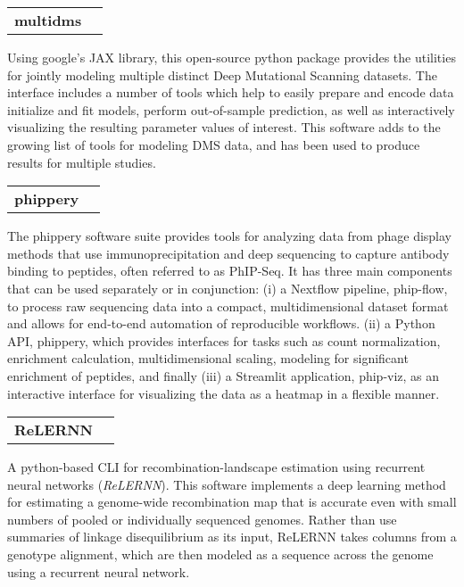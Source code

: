 \documentclass[letterpaper,9pt]{article}
\makeatletter
\let\oldhref\href
\newcommand{\resumeSoftwareSubheading}[3]{
  \vspace{-3pt}\item
    \begin{tabular*}{0.97\textwidth}[t]{l@{\extracolsep{\fill}}r}
      \textbf{#1}\label{#1} & #2 \\
    \end{tabular*}\vspace{-7pt}
    \begin{center}
    \begin{minipage}{0.87\textwidth}
    \linespread{0.80}\selectfont
        {\small#3}
    \end{minipage}\vspace{-7pt}
    \end{center}
}
\makeatother
\begin{document}
    \resumeSoftwareSubheading{multidms}
        {
            \oldhref{https://matsengrp.github.io/multidms/}{\faGlobe}
            \oldhref{https://www.biorxiv.org/content/10.1101/2023.07.31.551037v1}{\faNewspaper}
            \oldhref{https://github.com/matsengrp/multidms}{\faCode}
        }
        {
            Using google's JAX library, this open-source python package 
            provides the utilities for jointly modeling multiple distinct Deep Mutational Scanning datasets.
            The interface includes a number of tools which help to easily prepare and encode data
            initialize and fit models, perform out-of-sample prediction, 
            as well as interactively visualizing 
            the resulting parameter values of interest.
            This software adds to the growing list of tools for modeling DMS data,
            and has been used to produce results for multiple studies.
        }

    \resumeSoftwareSubheading{phippery}
        {
            \oldhref{https://matsengrp.github.io/phippery/introduction.html}{\faGlobe}
            \oldhref{https://academic.oup.com/bioinformatics/article/39/10/btad583/7280694}{\faNewspaper}
            \oldhref{https://github.com/matsengrp/phippery}{\faCode}
        }
        {
            The phippery software suite provides tools for analyzing data from phage display methods 
            that use immunoprecipitation and deep sequencing to capture antibody binding to peptides, 
            often referred to as PhIP-Seq. 
            It has three main components that can be used separately or in conjunction: 
            (i) a Nextflow pipeline, phip-flow, to process raw sequencing data into a compact, 
            multidimensional dataset format and allows for end-to-end automation of reproducible workflows. 
            (ii) a Python API, phippery, which provides interfaces for tasks such as count normalization, enrichment calculation, 
            multidimensional scaling, modeling for significant enrichment of peptides, and finally 
            (iii) a Streamlit application, phip-viz, as an interactive 
            interface for visualizing the data as a heatmap in a flexible manner.
        }
    \resumeSoftwareSubheading{ReLERNN}
        {
            \oldhref{https://academic.oup.com/mbe/article/37/6/1790/5741419?login=true}{\faNewspaper}
            \oldhref{https://github.com/kr-colab/ReLERNN}{\faCode}
        }
        {
            A python-based CLI for recombination-landscape estimation 
            using recurrent neural networks (\textit{ReLERNN}).
            This software implements a deep learning method for estimating 
            a genome-wide recombination map that is accurate 
            even with small numbers of pooled or individually sequenced genomes. 
            Rather than use summaries of linkage disequilibrium as its input, 
            ReLERNN takes columns from a genotype alignment, 
            which are then modeled as a sequence across the genome 
            using a recurrent neural network.
        }
\end{document}
